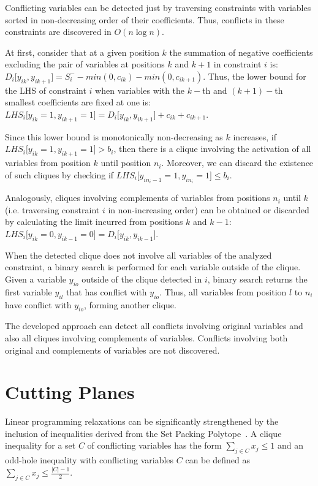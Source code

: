 \documentclass{endm}
\begin{document}
Conflicting variables can be detected just by traversing constraints with variables sorted in non-decreasing order of their coefficients. Thus, conflicts in these constraints are discovered in $O(n \log n)$. 

At first, consider that at a given position $k$ the summation of negative coefficients excluding the pair of variables at positions $k$ and $k+1$ in constraint $i$ is: $\displaystyle D_{i}\lbrack y_{ik}, y_{ik+1} \rbrack = S_i^- - min(0, c_{ik}) - min(0, c_{ik+1})$.  Thus, the lower bound for the LHS of constraint $i$ when variables with the $k-$th and $(k+1)-$th smallest coefficients are fixed at one is: $\displaystyle LHS_{i}\lbrack y_{ik} = 1, y_{ik+1} = 1 \rbrack = D_{i}\lbrack y_{ik}, y_{ik+1}\rbrack + c_{ik} + c_{ik+1}$.

Since this lower bound is monotonically non-decreasing as $k$ increases, if $\displaystyle LHS_{i}\lbrack y_{ik} = 1, y_{ik+1} = 1 \rbrack > b_{i}$, then there is a clique involving the activation of all variables from position $k$ until position $n_i$. Moreover, we can discard the existence of such cliques by checking if $\displaystyle LHS_{i}\lbrack y_{in_i-1} = 1, y_{in_i} = 1 \rbrack \leq b_i$.

Analogously, cliques involving complements of variables from positions $n_i$ until $k$ (i.e. traversing constraint $i$ in non-increasing order) can be obtained or discarded by calculating the limit incurred from positions $k$ and $k-1$: $\displaystyle LHS_{i}\lbrack y_{ik} = 0, y_{ik-1} = 0 \rbrack = D_{i}\lbrack y_{ik}, y_{ik-1}\rbrack$.

When the detected clique does not involve all variables of the analyzed constraint, a binary search is performed for each variable outside of the clique. Given a variable $y_{io}$ outside of the clique detected in $i$, binary search returns the first variable $y_{il}$ that has conflict with $y_{io}$. Thus, all variables from position $l$ to $n_i$ have conflict with $y_{io}$, forming another clique.

The developed approach can detect all conflicts involving original variables and also all cliques involving complements of variables. Conflicts involving both original and complements of variables are not discovered.

\section{Cutting Planes}\label{cut}

Linear programming relaxations can be significantly strengthened by the inclusion of inequalities derived from the Set Packing Polytope~\cite{Padberg1973,Rebennack2009}. A clique inequality for a set $C$ of conflicting variables has the form $ \sum_{j\in C}x_{j} \leq 1$ and an odd-hole inequality with conflicting variables $C$ can be defined as $ \sum_{j\in C}x_{j} \leq \frac{|C|-1}{2}$.
\end{document}
